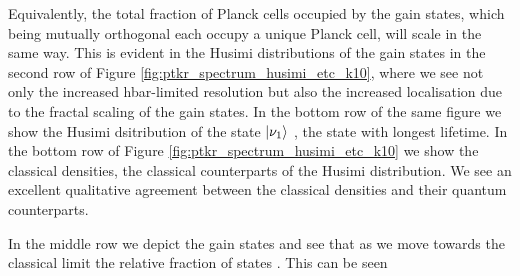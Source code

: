 \documentclass{iopart}
\begin{document}
	
	Equivalently, the total fraction of Planck cells occupied by the gain states, which being mutually orthogonal each occupy a unique Planck cell, will scale in the same way\cite{Henning_2010_frac_weyl}. This is evident in the Husimi distributions of the gain states in the second row of Figure \ref{fig:ptkr_spectrum_husimi_etc_k10}, where we see not only the increased hbar-limited resolution but also the increased localisation due to the fractal scaling of the gain states. In the bottom row of the same figure we show the Husimi dsitribution of the state $\ket{\nu_1}$ , the state with longest lifetime. 
	In the bottom row of Figure \ref{fig:ptkr_spectrum_husimi_etc_k10} we show the classical densities, the classical counterparts of the Husimi distribution. We see an excellent qualitative agreement between the classical densities and their quantum counterparts.
		
	
	
 In the middle row we depict the gain states and see that as we move towards the classical limit the relative fraction of states . This can be seen 
	
	
	
\end{document}
